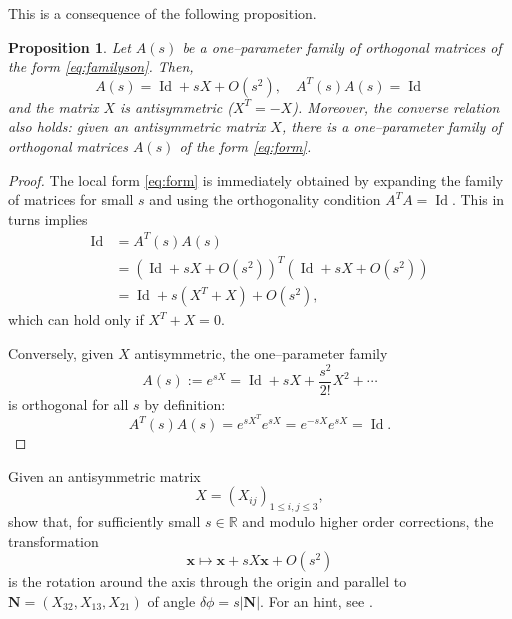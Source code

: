 \documentclass[english,fontsize=11pt,paper=a5,oneside]{scrbook}
\newcommand{\R}{\mathbb{R}}
\newcommand{\bx}{\bm{x}}
\DeclareMathOperator{\Id}{Id}
\newtheorem{proposition}[theorem]{Proposition}
\theoremstyle{definition}
\newenvironment{exercise}
  {\pushQED{\qed}\renewcommand{\qedsymbol}{$\maltese$}\exercisex}
  {\popQED\endexercisex}
\begin{document}
This is a consequence of the following proposition.
\begin{proposition}
    Let $A(s)$ be a one--parameter family of orthogonal matrices of the form \eqref{eq:familyson}.
    Then,
    \begin{equation}\label{eq:form}
        A(s) = \Id + sX + O(s^2), \quad A^T(s)A(s) = \Id
    \end{equation}
    and the matrix $X$ is antisymmetric ($X^T = - X$).
    Moreover, the converse relation also holds: given an antisymmetric matrix $X$, there is a one--parameter family of orthogonal matrices $A(s)$ of the form \eqref{eq:form}.
\end{proposition}
\begin{proof}
    The local form \eqref{eq:form} is immediately obtained by expanding the family of matrices for small $s$ and using the orthogonality condition $A^TA = \Id$.
    This in turns implies
    \begin{align}
        \Id &= A^T(s) A(s) \\
        &= \left(\Id + sX + O(s^2)\right)^T\left(\Id + sX + O(s^2)\right) \\
        &= \Id + s(X^T + X) + O(s^2),
    \end{align}
    which can hold only if $X^T + X =0$.

    Conversely, given $X$ antisymmetric, the one--parameter family
    \begin{equation}
        A(s) := e^{sX} = \Id + s X + \frac{s^2}{2!} X^2 + \cdots
    \end{equation}
    is orthogonal for all $s$ by definition:
    \begin{equation}
        A^T(s)A(s) = e^{sX^T}e^{sX} = e^{-sX} e^{sX} = \Id.
    \end{equation}
\end{proof}

\begin{exercise}[Euler theorem]\label{exe:rotations}
    Given an antisymmetric matrix 
    \begin{equation}
        X = (X_{ij})_{1\leq i,j\leq 3},
    \end{equation}
    show that, for sufficiently small $s\in\R$ and modulo higher order corrections, the transformation
    \begin{equation}
        \bx \mapsto \bx + s X \bx + O(s^2)
    \end{equation}
    is the rotation around the axis through the origin and parallel to $\bm{N}
     = (X_{32}, X_{13}, X_{21})$ of angle $\delta\phi = s|\bm{N}|$.
    For an hint, see \cite[Chpater 26.D]{book:arnold}.
\end{exercise}
\end{document}
